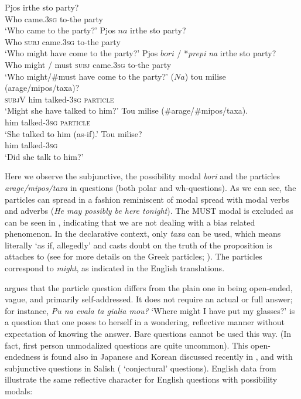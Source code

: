 \documentclass[output=paper,colorlinks,citecolor=brown]{langscibook}
\begin{document}
\ea 
\gll Pjos irthe sto party? \\
Who came\textsc{.3sg} to-the party \\
\glt `Who came to the party?'
\ex 
\gll Pjos $na$ irthe sto party? \\
Who \textsc{subj} came\textsc{.3sg} to-the party \\
\glt `Who might have come to the party?'
\ex
\gll Pjos $bori$ / \/*\textit{prepi} \textit{na} irthe sto party? \label{prepiout} \\
Who  might / must \textsc{subj} came\textsc{.3sg} to-the party \\
\glt `Who might/\#must have come to the party?'
\ex \label{ex:exclude:must}
\gll ($Na$) tou milise (arage/mipos/taxa)?\\
\textsc{subj}V him talked\textsc{-3sg} \textsc{particle} \\
\glt `Might she have talked to him?'
\ex 
\gll Tou milise (\#arage/\#mipos/taxa). \\
 him talked\textsc{-3sg} \textsc{particle} \\
\glt `She talked to him (as-if).' 
\ex
\gll Tou milise?\\
 him talked\textsc{-3sg}\\
\glt `Did she talk to him?'
\z

Here we observe the subjunctive, the possibility modal \textit{bori} and the particles \textit{arage/mipos/taxa} in questions (both polar and wh-questions). As we can see, the particles can spread in a fashion reminiscent of modal spread with modal verbs and adverbs (\textit{He may possibly be here tonight}). The \textsc{MUST} modal is excluded as can be seen in , indicating that we are not dealing with a bias  related phenomenon.  In the declarative context, only  \textit{taxa} can be used, which means literally `as if, allegedly' and casts doubt on the truth of the proposition is attaches to (see \citealt{giannakidou2022} for more details on the Greek particles; \citealt{ifantidou2001}). The particles correspond to \textit{might}, as indicated in the English translations. 

\citet{giannakidou2016} argues that the particle question differs from the plain one in being open-ended, vague, and primarily self-addressed. It does not require an actual or full answer; for instance, \textit{Pu na evala ta gialia mou?} `Where might I have put my glasses?'  is a question that one poses to herself in a wondering, reflective manner without expectation of knowing the answer.  Bare questions cannot be used this way.  (In fact, first person unmodalized questions are quite uncommon). This open-endedness is found also  in Japanese and Korean discussed recently in \citet{kang2018, kang2019}, and with subjunctive questions in Salish ( `conjectural' questions). English data from \citet{ernst2009, hacquard2012} illustrate the same reflective character for English questions with possibility modals:
\end{document}

